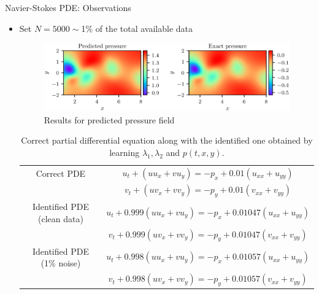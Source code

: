 \documentclass[xcolor=dvipsnames,10pt]{beamer}
\begin{document}
\begin{frame}[t]{Navier-Stokes PDE: Observations}
  \begin{itemize}
    \item<1-> Set $N = 5000\sim$1\% of the total available data
    \begin{figure}[H]
      \centering
      \includegraphics[width=0.9\linewidth]{pressurePredicted.eps}
      \caption{\footnotesize\centering
        Results for predicted pressure field}
    \end{figure}
    \begin{table}
      \centering\footnotesize
      \begin{tabular}{|c|c|}
        \hline Correct PDE & $u_{t}+\left(u u_{x}+v u_{y}\right)=-p_{x}+0.01\left(u_{x x}+u_{y y}\right)$ \\
        & $v_{t}+\left(u v_{x}+v v_{y}\right)=-p_{y}+0.01\left(v_{x x}+v_{y y}\right)$ \\
        \hline Identified PDE (clean data) & $u_{t}+0.999\left(u u_{x}+v u_{y}\right)=-p_{x}+0.01047\left(u_{x x}+u_{y y}\right)$ \\
        & $v_{t}+0.999\left(u v_{x}+v v_{y}\right)=-p_{y}+0.01047\left(v_{x x}+v_{y y}\right)$ \\
        \hline Identified PDE (1\% noise) & $u_{t}+0.998\left(u u_{x}+v u_{y}\right)=-p_{x}+0.01057\left(u_{x x}+u_{y y}\right)$ \\
        & $v_{t}+0.998\left(u v_{x}+v v_{y}\right)=-p_{y}+0.01057\left(v_{x x}+v_{y y}\right)$ \\
        \hline
        \end{tabular}
        \caption{\centering
          Correct partial differential equation along with the identified one obtained by learning $\lambda_1, \lambda_2$ and $p(t, x, y)$.
        }
    \end{table}
  \end{itemize}
\end{frame}
\end{document}
